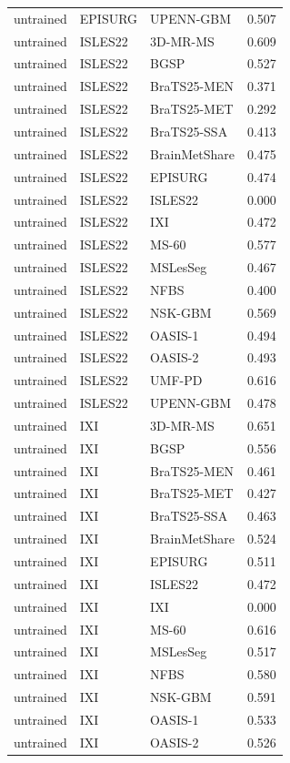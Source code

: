 \begin{tabular}{lllr}
untrained & EPISURG & UPENN-GBM & 0.507 \\
untrained & ISLES22 & 3D-MR-MS & 0.609 \\
untrained & ISLES22 & BGSP & 0.527 \\
untrained & ISLES22 & BraTS25-MEN & 0.371 \\
untrained & ISLES22 & BraTS25-MET & 0.292 \\
untrained & ISLES22 & BraTS25-SSA & 0.413 \\
untrained & ISLES22 & BrainMetShare & 0.475 \\
untrained & ISLES22 & EPISURG & 0.474 \\
untrained & ISLES22 & ISLES22 & 0.000 \\
untrained & ISLES22 & IXI & 0.472 \\
untrained & ISLES22 & MS-60 & 0.577 \\
untrained & ISLES22 & MSLesSeg & 0.467 \\
untrained & ISLES22 & NFBS & 0.400 \\
untrained & ISLES22 & NSK-GBM & 0.569 \\
untrained & ISLES22 & OASIS-1 & 0.494 \\
untrained & ISLES22 & OASIS-2 & 0.493 \\
untrained & ISLES22 & UMF-PD & 0.616 \\
untrained & ISLES22 & UPENN-GBM & 0.478 \\
untrained & IXI & 3D-MR-MS & 0.651 \\
untrained & IXI & BGSP & 0.556 \\
untrained & IXI & BraTS25-MEN & 0.461 \\
untrained & IXI & BraTS25-MET & 0.427 \\
untrained & IXI & BraTS25-SSA & 0.463 \\
untrained & IXI & BrainMetShare & 0.524 \\
untrained & IXI & EPISURG & 0.511 \\
untrained & IXI & ISLES22 & 0.472 \\
untrained & IXI & IXI & 0.000 \\
untrained & IXI & MS-60 & 0.616 \\
untrained & IXI & MSLesSeg & 0.517 \\
untrained & IXI & NFBS & 0.580 \\
untrained & IXI & NSK-GBM & 0.591 \\
untrained & IXI & OASIS-1 & 0.533 \\
untrained & IXI & OASIS-2 & 0.526 \\

\end{tabular}
